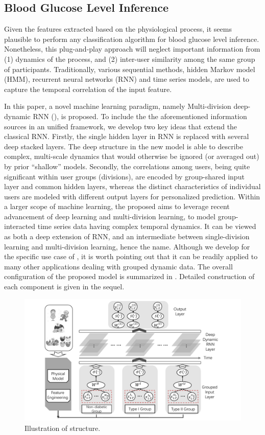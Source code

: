 \subsection{Blood Glucose Level Inference}
Given the features extracted based on the physiological process, it seems plausible to perform any classification algorithm for blood glucose level inference.
Nonetheless, this plug-and-play approach will neglect important information from (1) dynamics of the process, and (2) inter-user similarity among the same group of participants.
Traditionally, various sequential methods, \eg hidden Markov model (HMM), recurrent neural networks (RNN) and time series models, are used to capture the temporal correlation of the input feature.

In this paper, a novel machine learning paradigm, namely Multi-division deep-dynamic RNN (\modelname), is proposed.
To include the the aforementioned information sources in an unified framework, we develop two key ideas that extend the classical RNN.
Firstly, the single hidden layer in RNN is replaced with several deep stacked layers.
The deep structure in the new model is able to describe complex, multi-scale dynamics that would otherwise be ignored (or averaged out) by prior ``shallow'' models.
Secondly, the correlations among users, being quite significant within user groups (divisions), are encoded by group-shared input layer and common hidden layers, whereas the distinct characteristics of individual users are modeled with different output layers for personalized prediction.
Within a larger scope of machine learning, the proposed \modelname aims to leverage recent advancement of deep learning and multi-division learning, to model group-interacted time series data having complex temporal dynamics.
It can be viewed as both a deep extension of RNN, and an intermediate between single-division learning and multi-division learning, hence the name.
Although we develop \modelname for the specific use case of \sysname, it is worth pointing out that it can be readily applied to many other applications dealing with grouped dynamic data.
The overall configuration of the proposed model is summarized in .
Detailed construction of each component is given in the sequel.

\begin{figure}[h]
  \centering
  \includegraphics[width=0.75\columnwidth]{./img/pics_RNN3.pdf}
  \caption{Illustration of \modelname structure.}
  \label{fig:rnn}
\end{figure}

